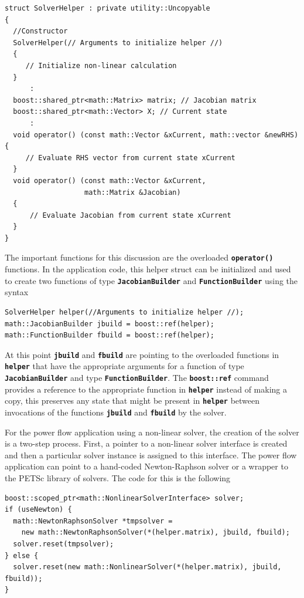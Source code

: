 \documentclass[12pt]{report} %
\begin{document}
{
\color{red}
\begin{Verbatim}[fontseries=b]
struct SolverHelper : private utility::Uncopyable
{
  //Constructor
  SolverHelper(// Arguments to initialize helper //)
  {
     // Initialize non-linear calculation
  }
      :
  boost::shared_ptr<math::Matrix> matrix; // Jacobian matrix
  boost::shared_ptr<math::Vector> X; // Current state
      :
  void operator() (const math::Vector &xCurrent, math::vector &newRHS)  {
     // Evaluate RHS vector from current state xCurrent
  }
  void operator() (const math::Vector &xCurrent,
                   math::Matrix &Jacobian)
  {
      // Evaluate Jacobian from current state xCurrent
  }
}
\end{Verbatim}
}

The important functions for this discussion are the overloaded \texttt{\textbf{operator()}} functions. In the application code, this helper struct can be initialized and used to create two functions of type \texttt{\textbf{JacobianBuilder}} and \texttt{\textbf{FunctionBuilder}} using the syntax

{
\color{red}
\begin{Verbatim}[fontseries=b]
SolverHelper helper(//Arguments to initialize helper //);
math::JacobianBuilder jbuild = boost::ref(helper);
math::FunctionBuilder fbuild = boost::ref(helper);
\end{Verbatim}
}

At this point \texttt{\textbf{jbuild}} and \texttt{\textbf{fbuild}} are pointing to the overloaded functions in \texttt{\textbf{helper}} that have the appropriate arguments for a function of type \texttt{\textbf{JacobianBuilder}} and type \texttt{\textbf{FunctionBuilder}}. The \texttt{\textbf{boost::ref}} command provides a reference to the appropriate function in \texttt{\textbf{helper}} instead of making a copy, this preserves any state that might be present in \texttt{\textbf{helper}} between invocations of the functions \texttt{\textbf{jbuild}} and \texttt{\textbf{fbuild}} by the solver.

For the power flow application using a non-linear solver, the creation of the solver is a two-step process. First, a pointer to a non-linear solver interface is created and then a particular solver instance is assigned to this interface. The power flow application can point to a hand-coded Newton-Raphson solver or a wrapper to the PETSc library of solvers. The code for this is the following

{
\color{red}
\begin{Verbatim}[fontseries=b]
boost::scoped_ptr<math::NonlinearSolverInterface> solver;
if (useNewton) {
  math::NewtonRaphsonSolver *tmpsolver =
    new math::NewtonRaphsonSolver(*(helper.matrix), jbuild, fbuild);
  solver.reset(tmpsolver);
} else {
  solver.reset(new math::NonlinearSolver(*(helper.matrix), jbuild, fbuild));
}
\end{Verbatim}
}
\end{document}
